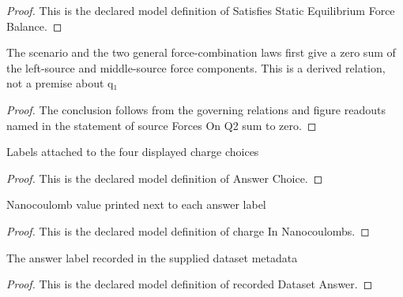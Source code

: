 \begin{proof}
  This is the declared model definition of Satisfies Static Equilibrium Force Balance.
\end{proof}
\begin{lemma}
  \label{lem:physics:phyx-mini-0900:phyxminiproblems-problemphyxmini0900-sourceforcesonq2-sum-to-zero}
  The scenario and the two general force-combination laws first give a zero sum of the left-source and middle-source force components. This is a derived relation, not a premise about q₁
\end{lemma}
\begin{proof}
  The conclusion follows from the governing relations and figure readouts named in the statement of source Forces On Q2 sum to zero.
\end{proof}
\begin{definition}
  \label{def:physics:phyx-mini-0900:phyxminiproblems-problemphyxmini0900-answerchoice}
  Labels attached to the four displayed charge choices
\end{definition}
\begin{proof}
  This is the declared model definition of Answer Choice.
\end{proof}
\begin{definition}
  \label{def:physics:phyx-mini-0900:phyxminiproblems-problemphyxmini0900-answerchoice-chargeinnanocoulombs}
  Nanocoulomb value printed next to each answer label
\end{definition}
\begin{proof}
  This is the declared model definition of charge In Nanocoulombs.
\end{proof}
\begin{definition}
  \label{def:physics:phyx-mini-0900:phyxminiproblems-problemphyxmini0900-recordeddatasetanswer}
  The answer label recorded in the supplied dataset metadata
\end{definition}
\begin{proof}
  This is the declared model definition of recorded Dataset Answer.
\end{proof}
